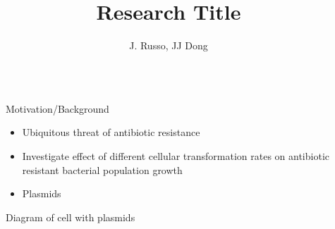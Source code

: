 \documentclass[final]{beamer}
\title{Research Title} %
\author{J. Russo, JJ Dong} %
\institute{Bucknell University, Department of Physics and Astronomy} %
\newlength{\sepwid}
\newlength{\onecolwid}
\begin{document}

\setlength{\belowcaptionskip}{2ex} %
\setlength\belowdisplayshortskip{2ex} %




\begin{frame}[t] %

\begin{block}

\begin{columns}[t] %
\begin{column}{\sepwid}\end{column} %

\begin{column}{\onecolwid}

  \begin{alertblock}{Motivation/Background}
  \begin{itemize}
    \item Ubiquitous threat of antibiotic resistance
    \item Investigate effect of different cellular transformation rates on antibiotic
    resistant bacterial population growth
    \item Plasmids
  \end{itemize}

  \begin{center}
    Diagram of cell with plasmids
  \end{center}
  \end{alertblock}
\end{column}

\begin{column}{\sepwid}\end{column} %


\end{columns}
\end{block}
\end{frame}
\end{document}
